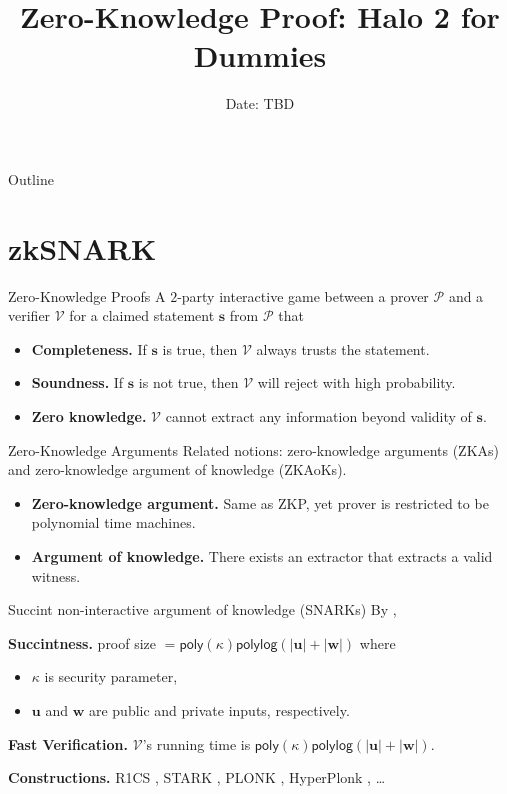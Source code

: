 \documentclass{beamer}
\title{Zero-Knowledge Proof: Halo 2 for Dummies}
\date{Date: TBD}
\newcommand{\prover}{\mathcal{P}}
\newcommand{\verifier}{\mathcal{V}}
\newcommand{\poly}{\mathsf{poly}}
\newcommand{\polylog}{\mathsf{polylog}}
\begin{document}
	\begin{frame}
		\titlepage
	\end{frame}
	
	\begin{frame}{Outline}
		\tableofcontents
	\end{frame}
	\section{zkSNARK}
	\begin{frame}{Zero-Knowledge Proofs}
		A $2$-party interactive game between a prover $\prover$ and a verifier $\verifier$ for a claimed statement $\mathbf{s}$ from $\prover$ that 
		\begin{itemize}
			\item \textbf{Completeness.} If $\mathbf{s}$ is true, then $\verifier$ always trusts the statement. 
			\item \textbf{Soundness.} If $\mathbf{s}$ is not true, then $\verifier$ will reject with high probability. 
			\item \textbf{Zero knowledge.} $\verifier$ cannot extract any information beyond validity of $\mathbf{s}$. 
		\end{itemize}
	\end{frame}
	
	\begin{frame}{Zero-Knowledge Arguments}
		Related notions: zero-knowledge arguments (ZKAs) and zero-knowledge argument of knowledge (ZKAoKs).
		\begin{itemize}
			\item \textbf{Zero-knowledge argument.} Same as ZKP, yet prover is restricted to be polynomial time machines.
			\item \textbf{Argument of knowledge.} There exists an extractor that extracts a valid witness.
		\end{itemize}
	\end{frame}
	
	\begin{frame}{Succint non-interactive argument of knowledge (SNARKs)}
		By \cite{eurocrypt/GennaroGP013},
		
		\textbf{Succintness.} proof size $= \poly(\kappa)\polylog(|\mathbf{u}| + |\mathbf{w}|)$ where 
		\begin{itemize}
			\item $\kappa$ is security parameter, 
			\item $\mathbf{u}$ and $\mathbf{w}$ are public and private inputs, respectively. 
		\end{itemize}
		
		\textbf{Fast Verification.} $\verifier$'s running time is $\poly(\kappa)\polylog(|\mathbf{u}| + |\mathbf{w}|)$.
		
		\textbf{Constructions.} R1CS \cite{eurocrypt/Groth16}, STARK \cite{iacr/Ben-SassonBHR18}, PLONK \cite{iacr/GabizonWC19}, HyperPlonk \cite{iacr/ChenBBZ22}, \dots
	\end{frame}
\end{document}
